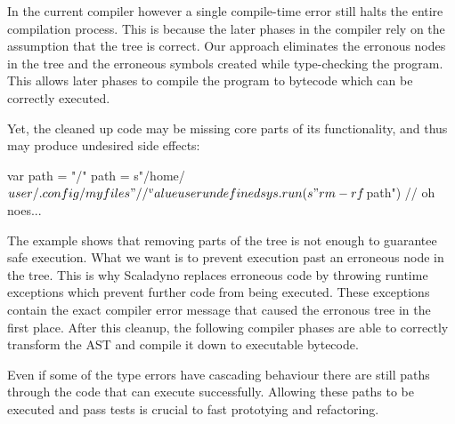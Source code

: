 In the current compiler however a single compile-time error still halts the entire compilation process. This is because the later phases in the compiler rely on the assumption that the tree is correct. Our approach eliminates the erronous nodes in the tree and the erroneous symbols created while type-checking the program. This allows later phases to compile the program to bytecode which can be correctly executed.

Yet, the cleaned up code may be missing core parts of its functionality, and thus may produce undesired side effects:

\begin{lstlisting-nobreak}
 var path = "/"
 path = s"/home/$user/.config/myfiles"
 //                  ^ value user undefined
 sys.run(s"rm -rf $path") // oh noes...
\end{lstlisting-nobreak}

The example shows that removing parts of the tree is not enough to guarantee safe execution. What we want is to prevent execution past an erroneous node in the tree. This is why Scaladyno replaces erroneous code by throwing runtime exceptions which prevent further code from being executed. These exceptions contain the exact compiler error message that caused the erronous tree in the first place. After this cleanup, the following compiler phases are able to correctly transform the AST and compile it down to executable bytecode.

Even if some of the type errors have cascading behaviour there are still paths through the code that can execute successfully. Allowing these paths to be executed and pass tests is crucial to fast prototying and refactoring.
